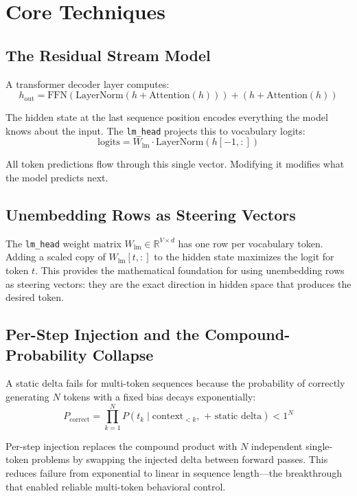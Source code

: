 \documentclass[11pt,a4paper]{article}
\begin{document}
\section{Core Techniques}

\subsection{The Residual Stream Model}

A transformer decoder layer computes:
\[
h_{\text{out}} = \text{FFN}(\text{LayerNorm}(h + \text{Attention}(h))) + (h + \text{Attention}(h))
\]

The hidden state at the last sequence position encodes everything the model knows about the input. The \texttt{lm\_head} projects this to vocabulary logits:
\[
\text{logits} = W_{\text{lm}} \cdot \text{LayerNorm}(h[-1,:])
\]

All token predictions flow through this single vector. Modifying it modifies what the model predicts next.

\subsection{Unembedding Rows as Steering Vectors}

The \texttt{lm\_head} weight matrix $W_{\text{lm}} \in \mathbb{R}^{V \times d}$ has one row per vocabulary token. Adding a scaled copy of $W_{\text{lm}}[t,:]$ to the hidden state maximizes the logit for token $t$. This provides the mathematical foundation for using unembedding rows as steering vectors: they are the exact direction in hidden space that produces the desired token.

\subsection{Per-Step Injection and the Compound-Probability Collapse}

A static delta fails for multi-token sequences because the probability of correctly generating $N$ tokens with a fixed bias decays exponentially:
\[
P_{\text{correct}} = \prod_{k=1}^N P(t_k \mid \text{context}_{<k}, \text{ + static delta}) < 1^N
\]

Per-step injection replaces the compound product with $N$ independent single-token problems by swapping the injected delta between forward passes. This reduces failure from exponential to linear in sequence length---the breakthrough that enabled reliable multi-token behavioral control.
\end{document}
